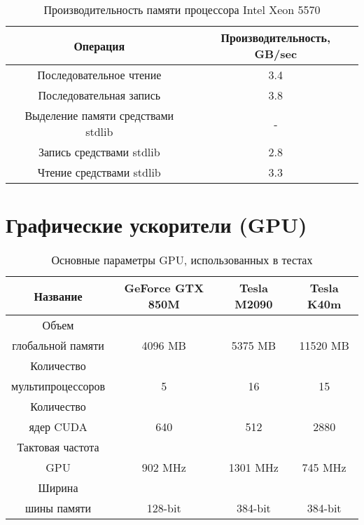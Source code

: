 \begin{table}[ht]
	\begin{center}
		\caption{Производительность памяти процессора Intel Xeon 5570}
		\begin{tabular}{|c|c|}
			\hline	
			Операция  &  Производительность, GB/sec \\ \hline
			Последовательное чтение &  3.4 	\\  \hline
			Последовательная запись &  3.8   \\  \hline
			Выделение памяти средствами stdlib &  -  \\  \hline
			Запись средствами stdlib  & 2.8  \\ \hline
			Чтение средствами stdlib  & 3.3  \\ \hline 
		\end{tabular}
	\end{center} 	
\end{table} 	


\clearpage
\section{Графические ускорители (GPU)}

\begin{table}[ht]
	\begin{center}
		\caption{Основные параметры GPU, использованных в тестах}
		\begin{tabular}{|c|c|c|c|}
			\hline
			Название                &  GeForce GTX 850M & Tesla M2090 & Tesla K40m \\ \hline
			Объем                  &                   &             &             \\
			глобальной памяти       & 4096 MB           & 5375 MB     & 11520 MB \\ \hline
			Количество              &             &               &     \\
			мультипроцессоров       & 5           &  16           & 15  \\ \hline
			Количество              &             &               &     \\
			ядер CUDA               & 640         & 512         & 2880  \\ \hline
			Тактовая частота        &             &             &         \\
			GPU                     & 902 MHz     & 1301 MHz    & 745 MHz \\ \hline
			Ширина                  &             &             &         \\
			шины памяти             & 128-bit     & 384-bit     & 384-bit \\ \hline
		\end{tabular}
		\label{GPUs}
	\end{center}
\end{table}



